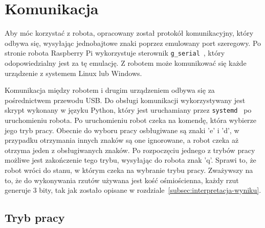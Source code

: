 \chapter{Komunikacja}\label{ch:komunikacja}
Aby móc korzystać z robota, opracowany został protokół komunikacyjny, który 
odbywa się, wysyłając jednobajtowe znaki poprzez emulowany port szeregowy. Po stronie robota Raspberry Pi wykorzystuje 
sterownik \texttt{g\_serial}~\cite{g_serial}, który odopowiedzialny jest za tę emulację. Z robotem może komunikować się 
każde urządzenie z systemem Linux lub Windows. 

Komunikacja między robotem i drugim urządzeniem odbywa się za pośrednictwem przewodu USB.
Do obsługi komunikacji wykorzystywany jest skrypt wykonany w języku Python, który jest uruchamiany 
przez \texttt{systemd}~\cite{systemd} po uruchomieniu robota. Po uruchomieniu robot czeka na komendę, która wybierze jego tryb pracy.
Obecnie do wyboru pracy osbługiwane są znaki 'e' i 'd', w przypadku otrzymania innych znaków są one ignorowane, a robot czeka aż otrzyma jeden z obsługiwanych znaków.
Po rozpoczęciu jednego z trybów pracy możliwe jest zakończenie tego trybu, wysyłając do robota znak 'q'. Sprawi to, że robot wróci do stanu, w którym czeka na wybranie 
trybu pracy. Zważywszy na to, że do wykonywania rzutów używana jest kość ośmiościenna, 
każdy rzut generuje 3 bity, tak jak zostało opisane w rozdziale~\ref{subsec:interpretacja-wyniku}.


\section{Tryb pracy} \label{sec:tryby}


